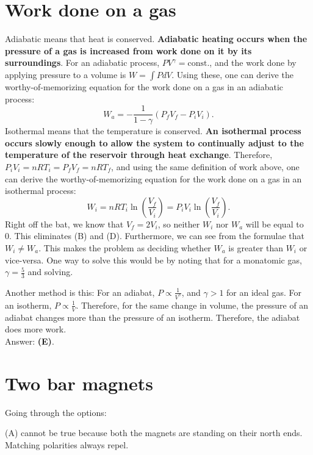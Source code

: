 \documentclass[11pt]{paper}
\newcommand{\answer}[1]{Answer: \textbf{(#1)}.}
\begin{document}
\section{Work done on a gas}
Adiabatic means that heat is conserved.  \textbf{Adiabatic heating occurs when the pressure of a gas is increased from work done on it by its surroundings}. For an adiabatic process, $PV^\gamma = \text{const.}$, and the work done by applying pressure to a volume is $W = \int P dV$.  Using these, one can derive the worthy-of-memorizing equation for the work done on a gas in an adiabatic process:
\begin{equation}
W_{a} = -\frac{1}{1-\gamma} \left( P_f V_f - P_i V_i \right).
\end{equation}
Isothermal means that the temperature is conserved.  \textbf{An isothermal process occurs slowly enough to allow the system to continually adjust to the temperature of the reservoir through heat exchange}. Therefore, $P_i V_i = n R T_i = P_f V_f = n R T_f$, and using the same definition of work above, one can derive the worthy-of-memorizing equation for the work done on a gas in an isothermal process:
\begin{equation}
W_{i} = n R T_i \ln \left( \frac{V_f}{V_i}\right) = P_i V_i \ln \left( \frac{V_f}{V_i}\right).
\end{equation}
Right off the bat, we know that $V_f = 2V_i$, so neither $W_i$ nor $W_a$ will be equal to 0.  This eliminates (B) and (D).  Furthermore, we can see from the formulae that $W_i \neq W_a$.  This makes the problem as deciding whether $W_a$ is greater than $W_i$ or vice-versa.  One way to solve this would be by noting that for a monatomic gas, $\gamma = \frac{5}{3}$ and solving.

Another method is this:  For an adiabat, $P \propto \frac{1}{V^\gamma}$, and $\gamma > 1$ for an ideal gas.  For an isotherm, $P \propto \frac{1}{V}$.  Therefore, for the same change in volume, the pressure of an adiabat changes more than the pressure of an isotherm.  Therefore, the adiabat does more work.\\

\answer{E}

\section{Two bar magnets}
Going through the options:

(A) cannot be true because both the magnets are standing on their north ends.  Matching polarities always repel.
\end{document}
